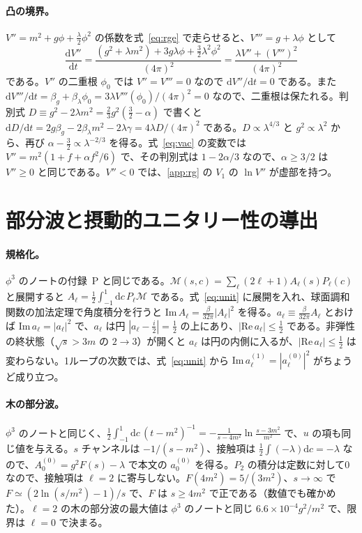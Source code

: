 \documentclass[a4paper,10pt]{ltjsarticle}
\newcommand{\dd}{\mathrm{d}}
\begin{document}
\paragraph{凸の境界。}$V''=m^2+g\phi+\frac\lambda2\phi^2$ の係数を式~\eqref{eq:rge} で走らせると、$V'''=g+\lambda\phi$ として
\begin{equation*}
\frac{\dd V''}{\dd t}=\frac{(g^2+\lambda m^2)+3g\lambda\phi+\frac32\lambda^2\phi^2}{(4\pi)^2}=\frac{\lambda V''+(V''')^2}{(4\pi)^2}
\end{equation*}
である。$V''$ の二重根 $\phi_0$ では $V''=V'''=0$ なので $\dd V''/\dd t=0$ である。また $\dd V'''/\dd t=\beta_g+\beta_\lambda\phi_0=3\lambda V'''(\phi_0)/(4\pi)^2=0$ なので、二重根は保たれる。判別式 $D\equiv g^2-2\lambda m^2=\frac23g^2(\frac32-\alpha)$ で書くと $\dd D/\dd t=2g\beta_g-2\beta_\lambda m^2-2\lambda\gamma=4\lambda D/(4\pi)^2$ である。$D\propto\lambda^{4/3}$ と $g^2\propto\lambda^2$ から、再び $\alpha-\frac32\propto\lambda^{-2/3}$ を得る。式~\eqref{eq:vac} の変数では $V''=m^2(1+f+\alpha f^2/6)$ で、その判別式は $1-2\alpha/3$ なので、$\alpha\ge3/2$ は $V''\ge0$ と同じである。$V''<0$ では、\ref{app:rg} の $V_1$ の $\ln V''$ が虚部を持つ。

\section{部分波と摂動的ユニタリー性の導出}\label{app:pw}

\paragraph{規格化。}$\phi^3$ のノートの付録~P と同じである。$\mathcal{M}(s,c)=\sum_\ell(2\ell+1)A_\ell(s)P_\ell(c)$ と展開すると $A_\ell=\frac12\int_{-1}^1\dd c\,P_\ell\mathcal{M}$ である。式~\eqref{eq:unit} に展開を入れ、球面調和関数の加法定理で角度積分を行うと $\mathrm{Im}\,A_\ell=\frac{\beta}{32\pi}|A_\ell|^2$ を得る。$a_\ell\equiv\frac{\beta}{32\pi}A_\ell$ とおけば $\mathrm{Im}\,a_\ell=|a_\ell|^2$ で、$a_\ell$ は円 $|a_\ell-\frac i2|=\frac12$ の上にあり、$|\mathrm{Re}\,a_\ell|\le\frac12$ である。非弾性の終状態（$\sqrt s>3m$ の $2\to3$）が開くと $a_\ell$ は円の内側に入るが、$|\mathrm{Re}\,a_\ell|\le\frac12$ は変わらない。1ループの次数では、式~\eqref{eq:unit} から $\mathrm{Im}\,a_\ell^{(1)}=|a_\ell^{(0)}|^2$ がちょうど成り立つ。

\paragraph{木の部分波。}$\phi^3$ のノートと同じく、$\frac12\int_{-1}^1\dd c\,(t-m^2)^{-1}=-\frac{1}{s-4m^2}\ln\frac{s-3m^2}{m^2}$ で、$u$ の項も同じ値を与える。$s$ チャンネルは $-1/(s-m^2)$、接触項は $\frac12\int(-\lambda)\dd c=-\lambda$ なので、$A_0^{(0)}=g^2F(s)-\lambda$ で本文の $a_0^{(0)}$ を得る。$P_2$ の積分は定数に対して0なので、接触項は $\ell=2$ に寄与しない。$F(4m^2)=5/(3m^2)$、$s\to\infty$ で $F\simeq(2\ln(s/m^2)-1)/s$ で、$F$ は $s\ge4m^2$ で正である（数値でも確かめた）。$\ell=2$ の木の部分波の最大値は $\phi^3$ のノートと同じ $6.6\times10^{-4}g^2/m^2$ で、限界は $\ell=0$ で決まる。
\end{document}
